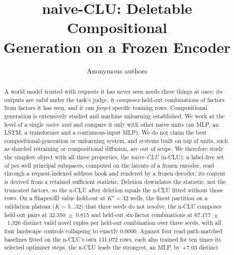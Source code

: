 \documentclass{article} %
\title{naive-CLU: Deletable Compositional\\ Generation on a Frozen Encoder}
\author{Anonymous authors}
\newcommand{\Kstar}{\ensuremath{K^{\star}}}
\begin{document}
\maketitle

\begin{abstract}
A world model trusted with requests it has never seen needs three things at once: its outputs are \emph{valid} under the task's judge, it \emph{composes}
held-out combinations of factors from factors it has seen, and it can \emph{forget} specific
training rows. Compositional generation is extensively studied and machine unlearning established. We work at the level of a single \emph{naive unit} and
compare it only with other naive units (an MLP, an LSTM, a transformer and a continuous-input MLP).
We do not claim the best compositional-generation or unlearning system, and systems built on top of
units, such as sharded retraining or compositional diffusion, are out of scope.
We therefore study the simplest object with all three properties, the \emph{naive-CLU} (n-CLU): a
label-free set of per-well principal subspaces, computed on the latents of a frozen
encoder, read through a request-indexed address book and rendered by a frozen decoder; its
content is derived from a retained sufficient statistic. Deletion downdates the statistic, not the truncated factors, so the n-CLU after deletion equals the n-CLU fitted without those rows.
On a Shapes3D value hold-out at $\Kstar=32$ wells, the finest partition on a validation plateau
($K=5\ldots32$) that three seeds do not resolve, %
the n-CLU composes held-out pairs at 32.350~$\pm$~0.815 and held-out six-factor combinations at
67.177~$\pm$~1.320 distinct valid novel tuples per held-out combination over three seeds, with all four landscape
controls collapsing to exactly 0.0000. %
Against four read-path-matched baselines fitted on the n-CLU's own 131,072 rows, each also trained for
ten times its selected optimiser steps, the n-CLU leads the strongest, an MLP, by +7.03 distinct

\end{abstract}
\end{document}

